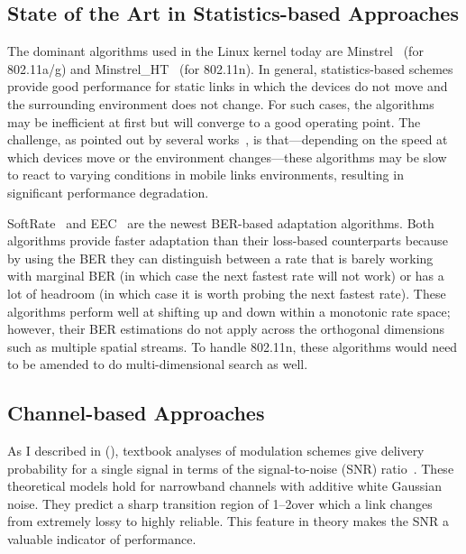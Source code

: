 \subsection{State of the Art in Statistics-based Approaches}
The dominant algorithms used in the Linux kernel today are Minstrel~\cite{Minstrel} (for 802.11a/g) and Minstrel\_HT~\cite{Minstrel_HT} (for 802.11n).  In general, statistics-based schemes provide good performance for static links in which the devices do not move and the surrounding environment does not change. For such cases, the algorithms may be inefficient at first but will converge to a good operating point. The challenge, as pointed out by several works~\cite{Holland_RBAR,Judd_CHARM,Vutukuru_SoftRate}, is that---depending on the speed at which devices move or the environment changes---these algorithms may be slow to react to varying conditions in mobile links environments, resulting in significant performance degradation.

SoftRate~\cite{Vutukuru_SoftRate} and EEC~\cite{Chen_EEC} are the newest BER-based adaptation algorithms. Both algorithms provide faster adaptation than their loss-based counterparts because by using the BER they can distinguish between a rate that is barely working with marginal BER (in which case the next fastest rate will not work) or has a lot of headroom (in which case it is worth probing the next fastest rate). These algorithms perform well at shifting up and down within a monotonic rate space; however, their BER estimations do not apply across the orthogonal dimensions such as multiple spatial streams. To handle 802.11n, these algorithms would need to be amended to do multi-dimensional search as well.

\subsection{Channel-based Approaches}
As I described in  (), textbook analyses of modulation schemes give delivery probability for a single signal in terms of the signal-to-noise (SNR) ratio~\cite{Goldsmith}.
These theoretical models hold for narrowband channels with additive white Gaussian noise. They predict a sharp transition region of 1--2\dB over which a link changes from extremely lossy to highly reliable. This feature in theory makes the SNR a valuable indicator of performance.

